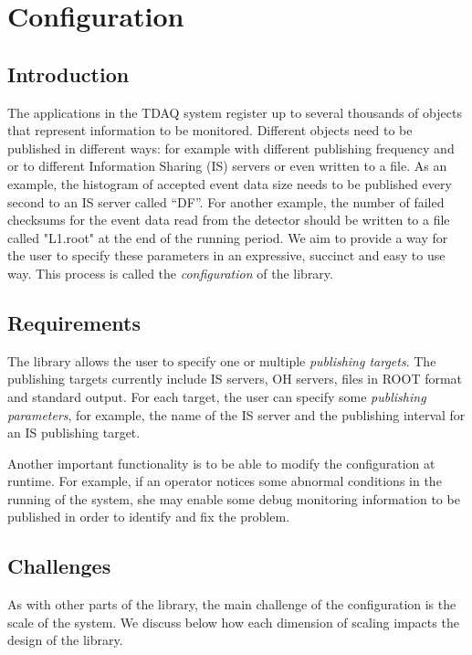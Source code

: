 \chapter{Configuration} %
\label{Capitolul3}

\section{Introduction}

The applications in the TDAQ system register up to several thousands of objects that represent information to be monitored. Different objects need to be published in different ways: for example with different publishing frequency and or to different Information Sharing (IS) servers \citep{kolosinformation} or even written to a file. As an example, the histogram of accepted event data size needs to be published every second to an IS server called “DF”. For another example, the number of failed checksums for the event data read from the detector should be written to a file called "L1.root" at the end of the running period. We aim to provide a way for the user to specify these parameters in an expressive, succinct and easy to use way. This process is called the \emph{configuration} of the library.

\section{Requirements}

The library allows the user to specify one or multiple \emph{publishing targets}. The publishing targets currently include IS servers, OH servers, files in ROOT \citep{brun1997root} format and standard output. For each target, the user can specify some \emph{publishing parameters}, for example, the name of the IS server and the publishing interval for an IS publishing target.

Another important functionality is to be able to modify the configuration at runtime. For example, if an operator notices some abnormal conditions in the running of the system, she may enable some debug monitoring information to be published in order to identify and fix the problem. 

\section{Challenges}

As with other parts of the library, the main challenge of the configuration is the scale of the system. We discuss below how each dimension of scaling impacts the design of the library.

